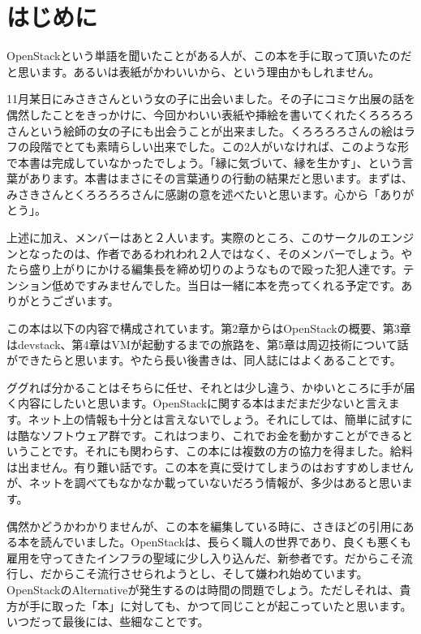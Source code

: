 \documentclass[8pt,b5paper,tombo,openany]{jsbook}
\begin{document}
\newpage

\thispagestyle{empty}
\dominitoc
\tableofcontents

\chapter{はじめに}

\setcounter{page}{1}

OpenStackという単語を聞いたことがある人が、この本を手に取って頂いたのだと思います。あるいは表紙がかわいいから、という理由かもしれません。

11月某日にみさきさんという女の子に出会いました。その子にコミケ出展の話を偶然したことをきっかけに、今回かわいい表紙や挿絵を書いてくれたくろろろろさんという絵師の女の子にも出会うことが出来ました。くろろろろさんの絵はラフの段階でとても素晴らしい出来でした。この2人がいなければ、このような形で本書は完成していなかったでしょう。「縁に気づいて、縁を生かす」、という言葉があります。本書はまさにその言葉通りの行動の結果だと思います。まずは、みさきさんとくろろろろさんに感謝の意を述べたいと思います。心から「ありがとう」。

上述に加え、メンバーはあと２人います。実際のところ、このサークルのエンジンとなったのは、作者であるわれわれ２人ではなく、そのメンバーでしょう。やたら盛り上がりにかける編集長を締め切りのようなもので殴った犯人達です。テンション低めですみませんでした。当日は一緒に本を売ってくれる予定です。ありがとうございます。

この本は以下の内容で構成されています。第2章からはOpenStackの概要、第3章はdevstack、第4章はVMが起動するまでの旅路を、第5章は周辺技術について話ができたらと思います。やたら長い後書きは、同人誌にはよくあることです。

ググれば分かることはそちらに任せ、それとは少し違う、かゆいところに手が届く内容にしたいと思います。OpenStackに関する本はまだまだ少ないと言えます。ネット上の情報も十分とは言えないでしょう。それにしては、簡単に試すには酷なソフトウェア群です。これはつまり、これでお金を動かすことができるということです。それにも関わらす、この本には複数の方の協力を得ました。給料は出ません。有り難い話です。この本を真に受けてしまうのはおすすめしませんが、ネットを調べてもなかなか載っていないだろう情報が、多少はあると思います。

偶然かどうかわかりませんが、この本を編集している時に、さきほどの引用にある本を読んでいました。OpenStackは、長らく職人の世界であり、良くも悪くも雇用を守ってきたインフラの聖域に少し入り込んだ、新参者です。だからこそ流行し、だからこそ流行させられようとし、そして嫌われ始めています。OpenStackのAlternativeが発生するのは時間の問題でしょう。ただしそれは、貴方が手に取った「本」に対しても、かつて同じことが起こっていたと思います。いつだって最後には、些細なことです。
\end{document}

